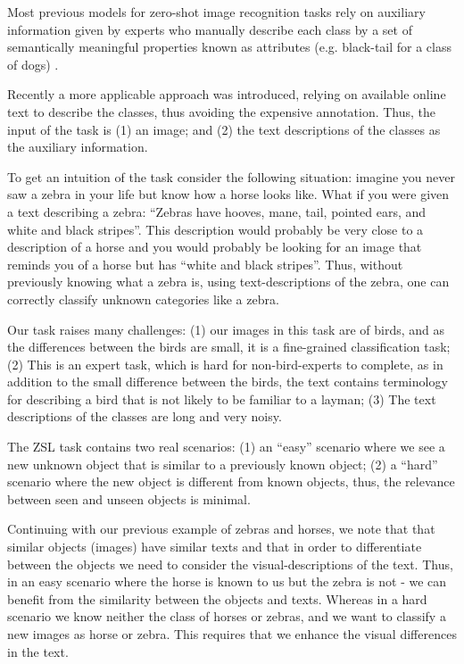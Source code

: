 \documentclass[11pt,a4paper]{article}
\begin{document}
Most previous models for zero-shot image recognition tasks rely on auxiliary information given by experts who manually describe each class by a set of semantically meaningful properties known as attributes (e.g. black-tail for a class of dogs) \citep{farhadi2009describing, lampert2009learning, atzmon2018probabilistic,akata2013label,wang2013unified,changpinyo2016synthesized, akata2015label,ji2018stacked}. \par




Recently a more 
applicable
approach was introduced, relying on available online text to describe the classes, thus avoiding the expensive annotation.
Thus, the input of the task is (1) an image; and (2) the text descriptions of the classes as the auxiliary information. \par

To get an intuition of the task consider the following situation:
imagine you never saw a zebra in your life but know how a horse looks like. What if you were given a text describing a zebra: \enquote{Zebras have hooves, mane, tail, pointed ears, and white and black stripes}. This description would probably be very close to a description of a horse and you would probably be looking for an image that reminds you of a horse but has \enquote{white and black stripes}. Thus, without previously knowing what a zebra is, using text-descriptions of the zebra, one can correctly classify unknown categories like a zebra.

Our task raises many challenges: (1) our images in this task are of birds, and as the differences between the birds are small, it is a fine-grained classification task; (2) This is an expert task, which is hard for non-bird-experts to complete, as in addition to the small difference between the birds, the text contains terminology for describing a bird that is not likely to be familiar to a layman;
(3) The text descriptions of the classes are long and very noisy. \par 



The ZSL task contains two real scenarios: (1) an \enquote{easy} scenario where we see a new unknown object that is similar to a previously known object; (2) a \enquote{hard} scenario where the new object is different from known objects, thus, the relevance between seen and unseen objects is minimal.\par

Continuing with our previous example of zebras and horses, we note that that similar objects (images) have similar texts and that in order to differentiate between the objects we need to consider the visual-descriptions of the text.  Thus, in an easy scenario where the horse is known to us but the zebra is not - we can benefit from the similarity between the objects and texts. Whereas in a hard scenario we know neither the class of horses or zebras, and we want to classify a new images as horse or zebra. This requires that we enhance the visual differences in the text.\par
\end{document}
